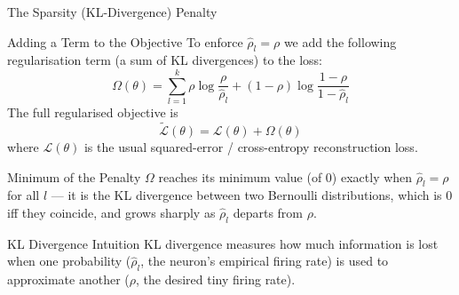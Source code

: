 \documentclass{beamer}
\begin{document}
\begin{frame}[shrink=10]{The Sparsity (KL-Divergence) Penalty}
  \begin{block}{Adding a Term to the Objective}
    To enforce $\hat{\rho}_l = \rho$ we add the following regularisation
    term (a sum of KL divergences) to the loss:
    \[
      \Omega(\theta)
        = \sum_{l=1}^{k}
          \rho\log\frac{\rho}{\hat{\rho}_l}
          + (1-\rho)\log\frac{1-\rho}{1-\hat{\rho}_l}
    \]
    The full regularised objective is
    \[
      \boxed{\;\widetilde{\mathcal L}(\theta) = \mathcal L(\theta) + \Omega(\theta)\;}
    \]
    where $\mathcal L(\theta)$ is the usual squared-error / cross-entropy
    reconstruction loss.
  \end{block}

  \begin{block}{Minimum of the Penalty}
    $\Omega$ reaches its minimum value (of $0$) exactly when
    $\boxed{\hat{\rho}_l = \rho}$ for all $l$ --- it is the KL divergence
    between two Bernoulli distributions, which is $0$ iff they coincide,
    and grows sharply as $\hat{\rho}_l$ departs from $\rho$.
  \end{block}

  \begin{exampleblock}{KL Divergence Intuition}
    KL divergence measures how much information is lost when one
    probability ($\hat{\rho}_l$, the neuron's empirical firing rate) is
    used to approximate another ($\rho$, the desired tiny firing rate).
  \end{exampleblock}
\end{frame}
\end{document}
